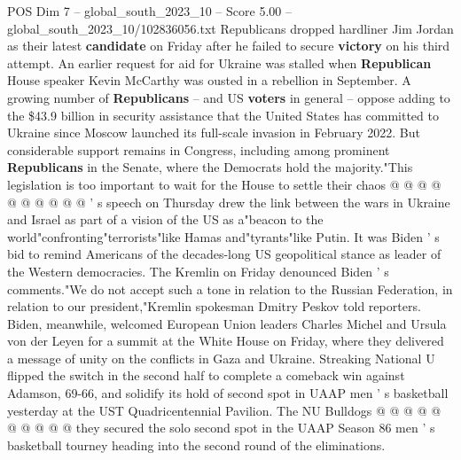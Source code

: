 \begin{textsample}{POS Dim 7 – global\_south\_2023\_10 – Score 5.00 – global\_south\_2023\_10/102836056.txt}
Republicans dropped hardliner Jim Jordan as their latest \textbf{candidate} on Friday after he failed to secure \textbf{victory} on his third attempt.
An earlier request for aid for Ukraine was stalled when \textbf{Republican} House speaker Kevin McCarthy was ousted in a rebellion in September.
A growing number of \textbf{Republicans} -- and US \textbf{voters} in general -- oppose adding to the \$43.9 billion in security assistance that the United States has committed to Ukraine since Moscow launched its full-scale invasion in February 2022.
But considerable support remains in Congress, including among prominent \textbf{Republicans} in the Senate, where the Democrats hold the majority."This legislation is too important to wait for the House to settle their chaos @ @ @ @ @ @ @ @ @ @ ' s speech on Thursday drew the link between the wars in Ukraine and Israel as part of a vision of the US as a"beacon to the world"confronting"terrorists"like Hamas and"tyrants"like Putin.
It was Biden ' s bid to remind Americans of the decades-long US geopolitical stance as leader of the Western democracies.
The Kremlin on Friday denounced Biden ' s comments."We do not accept such a tone in relation to the Russian Federation, in relation to our president,"Kremlin spokesman Dmitry Peskov told reporters.
Biden, meanwhile, welcomed European Union leaders Charles Michel and Ursula von der Leyen for a summit at the White House on Friday, where they delivered a message of unity on the conflicts in Gaza and Ukraine.
Streaking National U flipped the switch in the second half to complete a comeback win against Adamson, 69-66, and solidify its hold of second spot in UAAP men ' s basketball yesterday at the UST Quadricentennial Pavilion.
The NU Bulldogs @ @ @ @ @ @ @ @ @ @ they secured the solo second spot in the UAAP Season 86 men ' s basketball tourney heading into the second round of the eliminations.

\end{textsample}
